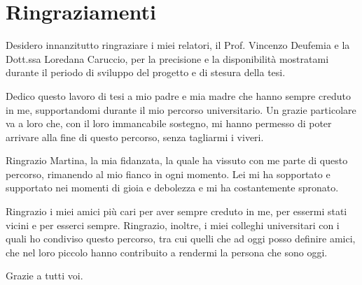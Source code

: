\chapter{Ringraziamenti}
Desidero innanzitutto ringraziare i miei relatori, il Prof. Vincenzo Deufemia e la Dott.ssa Loredana Caruccio, per la precisione e la disponibilit\`{a} mostratami durante il periodo di sviluppo del progetto e di stesura della tesi.\par
\vspace{5mm}
Dedico questo lavoro di tesi a mio padre e mia madre che hanno sempre creduto in me, supportandomi durante il mio percorso universitario. Un grazie particolare va a loro che, con il loro immancabile sostegno, mi hanno permesso di poter arrivare alla fine di questo percorso, senza tagliarmi i viveri.\par
\vspace{5mm}
Ringrazio Martina, la mia fidanzata, la quale ha vissuto con me parte di questo percorso, rimanendo al mio fianco in ogni momento. Lei mi ha sopportato e supportato nei momenti di gioia e debolezza e mi ha costantemente spronato.\par
\vspace{5mm}
Ringrazio i miei amici pi\`{u} cari per aver sempre creduto in me, per essermi stati vicini e per esserci sempre. Ringrazio, inoltre, i miei colleghi universitari con i quali ho condiviso questo percorso, tra cui quelli che ad oggi posso definire amici, che nel loro piccolo hanno contribuito a rendermi la persona che sono oggi.\par

\vfill
Grazie a tutti voi.